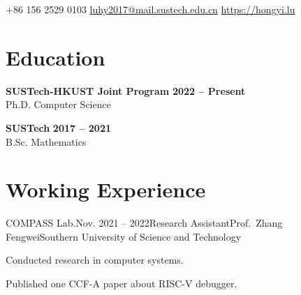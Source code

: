 \documentclass{resume}
\begin{document}
\begin{center}
    \contact
        {+86 156 2529 0103}
        {\href{mailto://luhy2017@mail.sustech.edu.cn}{luhy2017@mail.sustech.edu.cn}}
        {\href{https://hongyi.lu}{https://hongyi.lu}}
\end{center}

\section{Education} 
\begin{content}
    {\bf SUSTech-HKUST Joint Program}     
    \hfill {\bf 2022
    -- Present} 
    \\ {Ph.D. Computer Science} 

    {\bf SUSTech} \hfill {\bf 2017 -- 
    2021} \\ 
    {B.Sc. Mathematics} \hfill 
    
\sectionlineskip
\end{content}

\section{Working Experience}
\begin{content}

    \begin{position}{COMPASS Lab.}{Nov. 2021 -- 2022}{Research 
    Assistant}{Prof.~Zhang Fengwei}{Southern University of Science and 
    Technology}
    \item Conducted research in computer systems.
    \item Published one CCF-A paper about RISC-V debugger.
    \end{position}

\sectionlineskip
\end{content}
\vspace{-3\medskipamount}

\noindent
\renewcommand{\refname}{Publications}   %
\nocite{*}
\sectionlineskip
\end{document}
